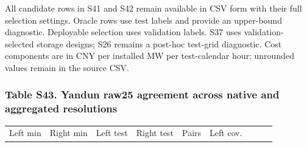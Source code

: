 \documentclass[a4paper,11pt]{article}
\newcounter{none}
\begin{document}
All candidate rows in S41 and S42 remain available in CSV form with their full selection settings. Oracle rows use test labels and provide an upper-bound diagnostic. Deployable selection uses validation labels. S37 uses validation-selected storage designs; S26 remains a post-hoc test-grid diagnostic. Cost components are in CNY per installed MW per test-calendar hour; unrounded values remain in the source CSV.

\subsubsection{Table S43. Yandun raw25 agreement across native and aggregated resolutions}\label{table-s43.-yandun-raw25-agreement-across-native-and-aggregated-resolutions}

{\def\LTcaptype{none} %
\begin{longtable}[]{@{}
  >{\raggedright\arraybackslash}p{}
  >{\raggedright\arraybackslash}p{}
  >{\raggedright\arraybackslash}p{}
  >{\raggedright\arraybackslash}p{}
  >{\raggedright\arraybackslash}p{}
  >{\raggedright\arraybackslash}p{}
  >{\raggedright\arraybackslash}p{}
  >{\raggedright\arraybackslash}p{}
  >{\raggedright\arraybackslash}p{}@{}}
\toprule\noalign{}
\begin{minipage}[b]{\linewidth}\raggedright
Left min
\end{minipage} & \begin{minipage}[b]{\linewidth}\raggedright
Right min
\end{minipage} & \begin{minipage}[b]{\linewidth}\raggedright
Left test
\end{minipage} & \begin{minipage}[b]{\linewidth}\raggedright
Right test
\end{minipage} & \begin{minipage}[b]{\linewidth}\raggedright
Pairs
\end{minipage} & \begin{minipage}[b]{\linewidth}\raggedright
Left cov.
\end{minipage} & \begin{minipage}[b]{\linewidth}\raggedright

\end{minipage}
\end{longtable}}
\end{document}
